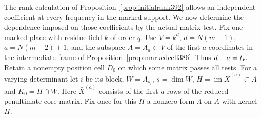 \documentclass[a4paper,11pt]{article}
\theoremstyle{definition}
\theoremstyle{remark}
\numberwithin{equation}{section}
\begin{document}
The rank calculation of Proposition~\ref{prop:initialrank392}
allows an independent coefficient at every frequency in the
marked support. We now determine the dependence imposed on
those coefficients by the actual matrix test. Fix one marked
place with residue field \(k\) of order \(q\). Use
\(V=k^d\), \(d=N(m-1)\), \(a=N(m-2)+1\), and the subspace
\(A=A_a\subset V\) of the first \(a\) coordinates in the
intermediate frame of Proposition~\ref{prop:markedcell386}.
Thus \(d-a=t_{\rm r}\). Retain a nonempty position cell \(D_0\)
on which some matrix passes all tests. For a varying determinant
let \(i\) be its block, \(W=A_{s_i}\), \(s=\dim W\),
\(H=\operatorname{im}\bar X^{(a)}\subset A\) and \(K_0=H\cap W\).
Here \(\bar X^{(a)}\) consists of the first \(a\) rows of the
reduced penultimate core matrix. Fix once for this \(H\) a
nonzero form \(\Lambda\) on \(A\) with kernel \(H\).
\end{document}
